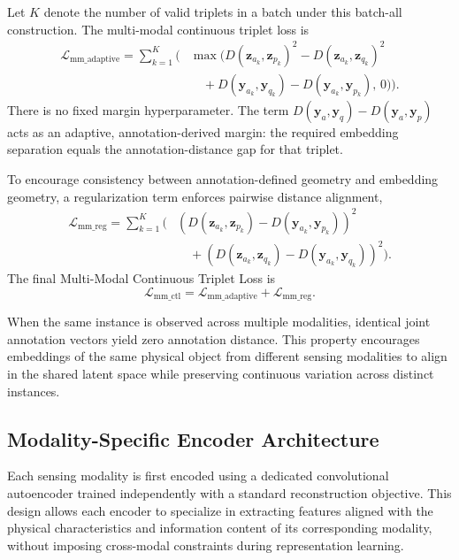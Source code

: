\documentclass[10pt,twocolumn,letterpaper]{article}
\begin{document}
Let $K$ denote the number of valid triplets in a batch under this batch-all construction. The multi-modal continuous triplet loss is
\begin{equation}
\label{eq:mm-adaptive}
\begin{aligned}
\mathcal{L}_{\text{mm\_adaptive}}
=
\sum_{k=1}^{K}
\Big(
& \max\!\big(
D(\mathbf{z}_{a_k},\mathbf{z}_{p_k})^2
-
D(\mathbf{z}_{a_k},\mathbf{z}_{q_k})^2 \\
& \quad +
D(\mathbf{y}_{a_k},\mathbf{y}_{q_k})
-
D(\mathbf{y}_{a_k},\mathbf{y}_{p_k}),
\, 0
\big)
\Big).
\end{aligned}
\end{equation}
There is no fixed margin hyperparameter. The term $D(\mathbf{y}_{a},\mathbf{y}_{q})-D(\mathbf{y}_{a},\mathbf{y}_{p})$ acts as an adaptive, annotation-derived margin: the required embedding separation equals the annotation-distance gap for that triplet.

To encourage consistency between annotation-defined geometry and embedding
geometry, a regularization term enforces pairwise distance alignment,
\begin{equation}
\label{eq:mm-reg}
\begin{aligned}
\mathcal{L}_{\text{mm\_reg}}
=
\sum_{k=1}^{K}
\Big(
& \left(
D(\mathbf{z}_{a_k},\mathbf{z}_{p_k})
-
D(\mathbf{y}_{a_k},\mathbf{y}_{p_k})
\right)^2 \\
& \quad +
\left(
D(\mathbf{z}_{a_k},\mathbf{z}_{q_k})
-
D(\mathbf{y}_{a_k},\mathbf{y}_{q_k})
\right)^2
\Big).
\end{aligned}
\end{equation}
The final Multi-Modal Continuous Triplet Loss is
\begin{equation}
\mathcal{L}_{\text{mm\_ctl}}
=
\mathcal{L}_{\text{mm\_adaptive}}
+
\mathcal{L}_{\text{mm\_reg}}.
\end{equation}

When the same instance is observed across multiple modalities, identical joint
annotation vectors yield zero annotation distance. This property encourages
embeddings of the same physical object from different sensing modalities to
align in the shared latent space while preserving continuous variation across
distinct instances.


\subsection{Modality-Specific Encoder Architecture}

Each sensing modality is first encoded using a dedicated convolutional autoencoder trained independently with a standard reconstruction objective. This design allows each encoder to specialize in extracting features aligned with the physical characteristics and information content of its corresponding modality, without imposing cross-modal constraints during representation learning.
\end{document}
